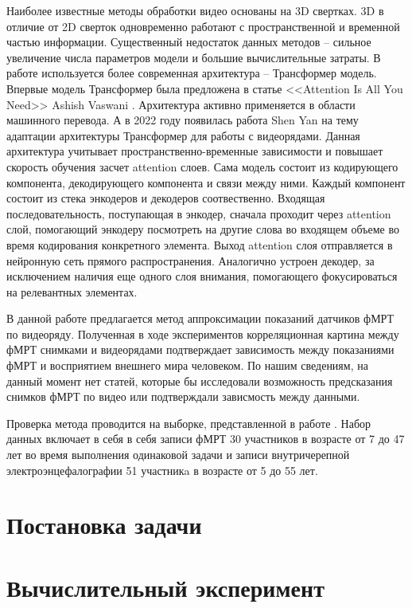 \documentclass[12pt,twoside]{article}
\begin{document}
Наиболее известные методы обработки видео основаны на 3D свертках. 
3D в отличие от 2D сверток одновременно работают с пространственной  
и временной частью информации. Существенный недостаток данных методов -- 
сильное увеличение числа параметров модели и большие вычислительные затраты.
В работе используется более современная архитектура -- Трансформер модель.
Впервые модель Трансформер была предложена в статье <<Attention Is All You Need>> Ashish Vaswani 
\citep{https://doi.org/10.48550/arxiv.1706.03762}. Архитектура активно применяется в области машинного перевода.
А в 2022 году появилась работа Shen Yan \citep{transformer} на тему адаптации архитектуры Трансформер для работы с видеорядами. 
Данная архитектура учитывает пространственно-временные зависимости и повышает скорость обучения засчет attention слоев.
Сама модель состоит из кодирующего компонента, декодирующего компонента и связи между ними. Каждый компонент состоит из стека 
энкодеров и декодеров соотвественно. 
Входящая последовательность, поступающая в энкодер, сначала проходит через attention слой, помогающий энкодеру 
посмотреть на другие слова во входящем объеме во время кодирования конкретного элемента. 
Выход attention слоя отправляется в нейронную сеть прямого распространения. 
Аналогично устроен декодер, за исключением наличия еще одного слоя внимания, помогающего фокусироваться на релевантных элементах.

В данной работе предлагается метод аппроксимации показаний датчиков фМРТ по видеоряду.
Полученная в ходе экспериментов корреляционная картина между  фМРТ снимками и видеорядами подтверждает 
зависимость между показаниями фМРТ и восприятием внешнего мира человеком. 
По нашим сведениям, на данный момент нет статей, которые бы исследовали возможность 
предсказания снимков фМРТ по видео или подтверждали зависмость между данными. 

Проверка метода проводится на выборке, представленной в работе \citep{Berezutskaya2022}. 
Набор данных включает в себя в себя записи фМРТ 30 участников в возрасте от 7 до 47 лет во время 
выполнения одинаковой задачи и записи внутричерепной электроэнцефалографии 51 участникa в возрасте от 5 до 55 лет. 




\section{Постановка задачи}

\section{Вычислительный эксперимент}
\end{document}
